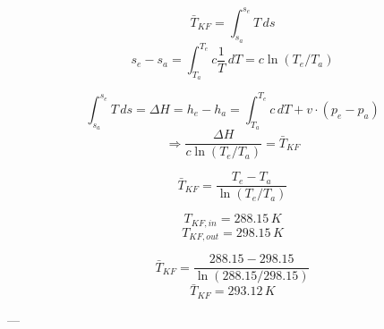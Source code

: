 \[ \bar{T}_{KF} = \int_{s_a}^{s_e} T \, ds \]  
\[ s_e - s_a = \int_{T_a}^{T_e} c \frac{1}{T} \, dT = c \ln(T_e / T_a) \]  

\[ \int_{s_a}^{s_e} T \, ds = \Delta H = h_e - h_a = \int_{T_a}^{T_e} c \, dT + v \cdot (p_e - p_a) \]  
\[ \Rightarrow \frac{\Delta H}{c \ln(T_e / T_a)} = \bar{T}_{KF} \]  

\[ \bar{T}_{KF} = \frac{T_{e} - T_{a}}{\ln(T_{e} / T_{a})} \]  

\[ T_{KF,in} = 288.15 \, K \]  
\[ T_{KF,out} = 298.15 \, K \]  

\[ \bar{T}_{KF} = \frac{288.15 - 298.15}{\ln(288.15 / 298.15)} \]  
\[ \bar{T}_{KF} = 293.12 \, K \]  

---